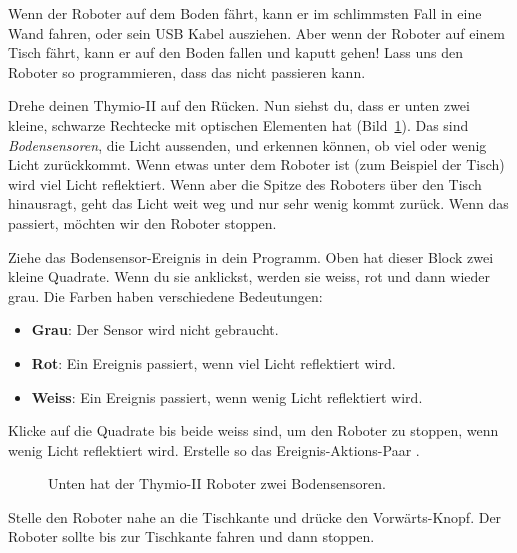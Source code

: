 Wenn der Roboter auf dem Boden fährt, kann er im schlimmsten Fall in eine Wand
fahren, oder sein USB Kabel ausziehen. Aber wenn der Roboter auf einem Tisch
fährt, kann er auf den Boden fallen und kaputt gehen! Lass uns den Roboter so
programmieren, dass das nicht passieren kann.


Drehe deinen Thymio-II auf den Rücken. Nun siehst du, dass er unten zwei
kleine, schwarze Rechtecke mit optischen Elementen hat (Bild~\ref{fig.bottom}).
Das sind \emph{Bodensensoren}, die Licht aussenden, und erkennen können, ob
viel oder wenig Licht zurückkommt. Wenn etwas unter dem Roboter ist (zum
Beispiel der Tisch) wird viel Licht reflektiert. Wenn aber die Spitze des
Roboters über den Tisch hinausragt, geht das Licht weit weg und nur sehr wenig
kommt zurück. Wenn das passiert, möchten wir den Roboter stoppen.


Ziehe das Bodensensor-Ereignis  in dein Programm. Oben hat
dieser Block zwei kleine Quadrate. Wenn du sie anklickst, werden sie weiss, rot
und dann wieder grau. Die Farben haben verschiedene Bedeutungen:

\begin{itemize}
\item \textbf{Grau}: Der Sensor wird nicht gebraucht.
\item \textbf{Rot}: Ein Ereignis passiert, wenn viel Licht reflektiert wird.
\item \textbf{Weiss}: Ein Ereignis passiert, wenn wenig Licht reflektiert wird. 
\end{itemize}

Klicke auf die Quadrate bis beide weiss sind, um den Roboter zu stoppen, wenn
wenig Licht reflektiert wird. Erstelle so das Ereignis-Aktions-Paar
.

\begin{figure}
\begin{center}
\caption{Unten hat der Thymio-II Roboter zwei Bodensensoren.}\label{fig.bottom}
\end{center}
\end{figure}

Stelle den Roboter nahe an die Tischkante und drücke den Vorwärts-Knopf. Der
Roboter sollte bis zur Tischkante fahren und dann stoppen.


